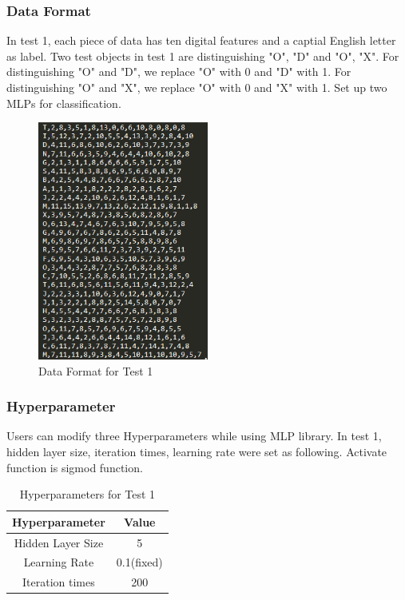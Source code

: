 \documentclass[letterpaper]{article}
\begin{document}
\subsubsection{Data Format}
In test 1, each piece of data has ten digital features and a captial English letter as label. Two test objects in test 1 are distinguishing "O", "D" and "O", "X". For distinguishing "O" and "D", we replace "O" with 0 and "D" with 1. For distinguishing "O" and "X", we replace "O" with 0 and "X" with 1. Set up two MLPs for classification.
\begin{figure}[H]
\centering
\includegraphics[width=0.5\textwidth]{data.png}
\caption{\label{fig:frog}Data Format for Test 1}
\end{figure}
\subsubsection{Hyperparameter}
Users can modify three Hyperparameters while using MLP library. In test 1, hidden layer size, iteration times, learning rate were set as following. Activate function is sigmod function.
\begin{table}[H]
\centering
\begin{tabular}{|c|c|}
 \hline
Hyperparameter& Value \\
 \hline
Hidden Layer Size & 5   \\
 \hline
Learning Rate& 0.1(fixed)\\
  \hline
Iteration times & 200\\
\hline
\end{tabular}\\
\caption{\label{tab:widgets}Hyperparameters for Test 1}
\end{table}
\end{document}
